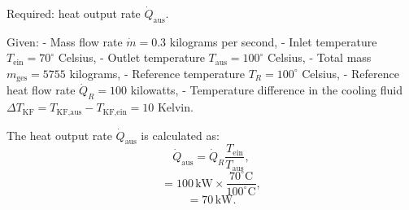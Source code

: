 Required: heat output rate \( \dot{Q}_{\text{aus}} \).

Given:
- Mass flow rate \( \dot{m} = 0.3 \) kilograms per second,
- Inlet temperature \( T_{\text{ein}} = 70^\circ \) Celsius,
- Outlet temperature \( T_{\text{aus}} = 100^\circ \) Celsius,
- Total mass \( m_{\text{ges}} = 5755 \) kilograms,
- Reference temperature \( T_R = 100^\circ \) Celsius,
- Reference heat flow rate \( \dot{Q}_R = 100 \) kilowatts,
- Temperature difference in the cooling fluid \( \Delta T_{\text{KF}} = T_{\text{KF,aus}} - T_{\text{KF,ein}} = 10 \) Kelvin.

The heat output rate \( \dot{Q}_{\text{aus}} \) is calculated as:
\[ \dot{Q}_{\text{aus}} = \dot{Q}_R \frac{T_{\text{ein}}}{T_{\text{aus}}}, \]
\[ = 100 \, \text{kW} \times \frac{70^\circ \text{C}}{100^\circ \text{C}}, \]
\[ = 70 \, \text{kW}. \]